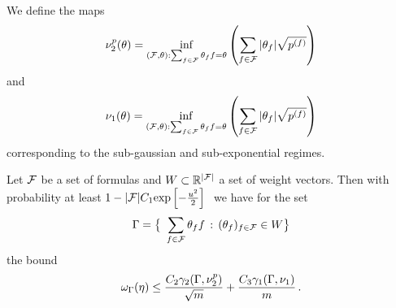 We define the maps
	\[ \nu^p_2(\theta) =  \inf_{(\mathcal{F},\theta) : \sum_{f\in\mathcal{F}}\theta_{f}f = \theta}  \left( \sum_{f\in\mathcal{F}} |\theta_{f}| \sqrt{p^{(f)}} \right) \]
and
	\[ \nu_1(\theta) =  \inf_{(\mathcal{F},\theta) : \sum_{f\in\mathcal{F}}\theta_{f}f = \theta} \left( \sum_{f\in\mathcal{F}} |\theta_{f}| \sqrt{p^{(f)}} \right)  \]
corresponding to the sub-gaussian and sub-exponential regimes.


\begin{theorem}
	Let $\mathcal{F}$ be a set of formulas and $W\subset\mathbb{R}^{|\mathcal{F}|}$ a set of weight vectors.
	Then with probability at least $1- |\mlnformulaset| C_1 \expof{-\frac{u^2}{2}} $ we have for the set
		\[ \Gamma = \big\{ \sum_{\mlnformulain}\weightof{\exformula}\exformula \, : \, (\weightof{\exformula})_{\mlnformulain} \in W \big\} \]
	the bound
		\[ \omega_\Gamma(\eta)  \leq \frac{C_2 \gamma_{2}(\Gamma,\nu^p_2)}{\sqrt{m}} + \frac{C_3 \gamma_{1}(\Gamma,\nu_1)}{m} \, . \]
\end{theorem}




%
%
%
%
%
%
